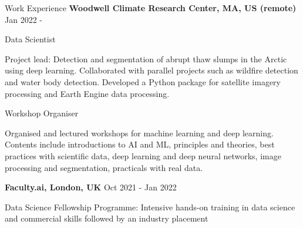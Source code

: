 \documentclass{resume} %
\newenvironment{indentpar}[1]%
  {\begin{list}{}%
          {\setlength{\leftmargin}{#1}}%
          \item[]%
  }
  {\end{list}}
\begin{document}
\begin{rSection}{Work Experience}
{\bf Woodwell Climate Research Center, MA, US (remote)} \hfill {Jan 2022 - } 

    \begin{indentpar} {0.5cm} Data Scientist
    
    Project lead: Detection and segmentation of abrupt thaw slumps in the Arctic using deep learning. Collaborated with parallel projects such as wildfire detection and water body detection. Developed a Python package for satellite imagery processing and Earth Engine data processing.
    
    Workshop Organiser
    
    Organised and lectured workshops for machine learning and deep learning. Contents include introductions to AI and ML, principles and theories, best practices with scientific data, deep learning and deep neural networks, image processing and segmentation, practicals with real data.
    \end{indentpar}
    
    {\bf Faculty.ai, London, UK} \hfill {Oct 2021 - Jan 2022} 
    
    \begin{indentpar}{0.5cm}
    Data Science Fellowship Programme: Intensive hands-on training in data science and commercial skills followed by an industry placement
    \end{indentpar}
\end{rSection}
\end{document}
